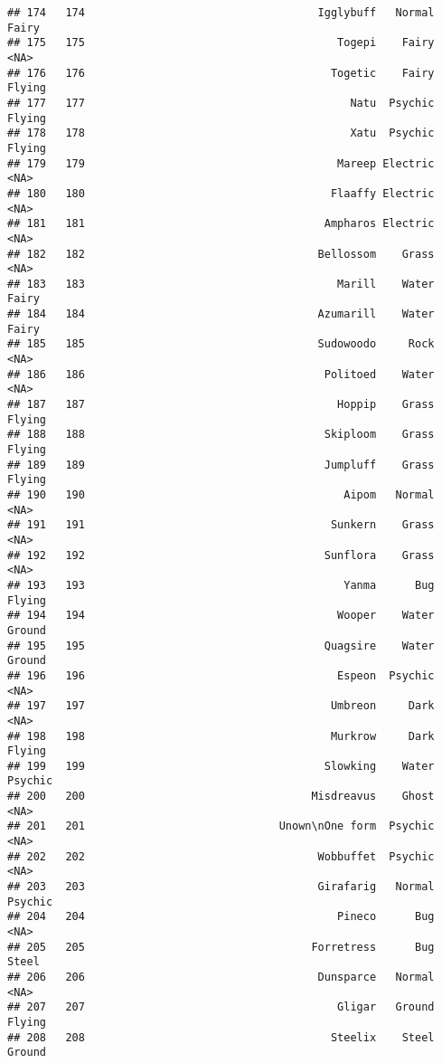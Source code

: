 \documentclass[
]{article}
\begin{document}
\begin{verbatim}
## 174   174                                    Igglybuff   Normal    Fairy
## 175   175                                       Togepi    Fairy     <NA>
## 176   176                                      Togetic    Fairy   Flying
## 177   177                                         Natu  Psychic   Flying
## 178   178                                         Xatu  Psychic   Flying
## 179   179                                       Mareep Electric     <NA>
## 180   180                                      Flaaffy Electric     <NA>
## 181   181                                     Ampharos Electric     <NA>
## 182   182                                    Bellossom    Grass     <NA>
## 183   183                                       Marill    Water    Fairy
## 184   184                                    Azumarill    Water    Fairy
## 185   185                                    Sudowoodo     Rock     <NA>
## 186   186                                     Politoed    Water     <NA>
## 187   187                                       Hoppip    Grass   Flying
## 188   188                                     Skiploom    Grass   Flying
## 189   189                                     Jumpluff    Grass   Flying
## 190   190                                        Aipom   Normal     <NA>
## 191   191                                      Sunkern    Grass     <NA>
## 192   192                                     Sunflora    Grass     <NA>
## 193   193                                        Yanma      Bug   Flying
## 194   194                                       Wooper    Water   Ground
## 195   195                                     Quagsire    Water   Ground
## 196   196                                       Espeon  Psychic     <NA>
## 197   197                                      Umbreon     Dark     <NA>
## 198   198                                      Murkrow     Dark   Flying
## 199   199                                     Slowking    Water  Psychic
## 200   200                                   Misdreavus    Ghost     <NA>
## 201   201                              Unown\nOne form  Psychic     <NA>
## 202   202                                    Wobbuffet  Psychic     <NA>
## 203   203                                    Girafarig   Normal  Psychic
## 204   204                                       Pineco      Bug     <NA>
## 205   205                                   Forretress      Bug    Steel
## 206   206                                    Dunsparce   Normal     <NA>
## 207   207                                       Gligar   Ground   Flying
## 208   208                                      Steelix    Steel   Ground

\end{verbatim}
\end{document}
